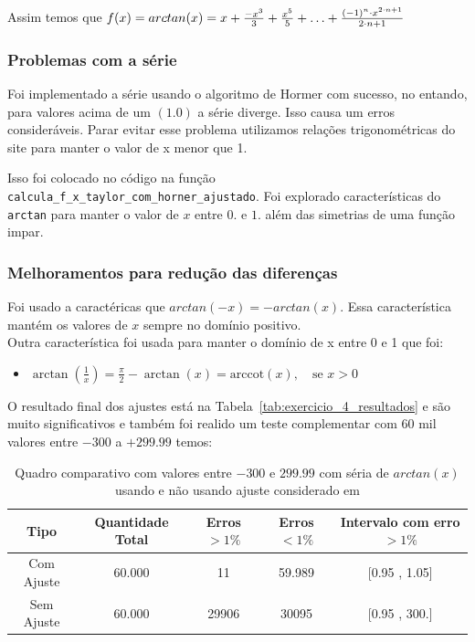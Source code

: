 Assim temos que $f(x) = arctan(x) = x + \frac{-x^3}{3} + \frac{x^5}{5} + \mathellipsis + \frac{(-1)^n \cdot x^{2 \cdot n + 1}}{2 \cdot n + 1} $

\subsubsection{Problemas com a série}

Foi implementado a série usando o algoritmo de Hormer com sucesso, no entando, para valores acima de um $(1.0)$ a série diverge.
Isso causa um erros consideráveis. Parar evitar esse problema utilizamos relações trigonométricas do site \cite{site-geek} para manter o valor de x menor que 1.

Isso foi colocado no código na função \texttt{calcula\_f\_x\_taylor\_com\_horner\_ajustado}. Foi explorado características do \texttt{arctan} para manter o valor de $x$ entre $0.$ e $1.$ além das simetrias de uma função impar.

\subsubsection{Melhoramentos para redução das diferenças}
\label{sec:melhoramentos-serie-arctan}

Foi usado a caractéricas que $arctan(-x) = -arctan(x)$. Essa característica mantém os valores de $x$ sempre no domínio positivo.\\
Outra característica foi usada para manter o domínio de x entre 0 e 1 que foi:

\begin{itemize}
    \item[] $\arctan\left(\frac{1}{x}\right) = \frac{\pi}{2} - \arctan(x) = \mathrm{arccot}(x), \quad \text{se } x > 0$
\end{itemize}

O resultado final dos ajustes está na Tabela~\ref{tab:exercicio_4_resultados} e são muito significativos e também foi realido um teste complementar com 60 mil valores entre $-300$ a $+299.99$ temos:

\begin{table}[h!]
    \centering
    \caption{Quadro comparativo com valores entre $-300$ e $299.99$ com séria de $arctan(x)$ usando e não usando ajuste considerado em \cite{site-geek}}
    \label{tab:exercicio_4_critica_1}
    \begin{tabular}{|c|c|c|c|c|}
        \hline
        \textbf{Tipo} & \textbf{Quantidade Total} & \textbf{Erros $>1\%$} & \textbf{Erros $<1\%$} & \textbf{Intervalo com erro $>1 \%$} \\
        \hline
        Com Ajuste & 60.000 & 11 & 59.989 & [0.95 , 1.05] \\
        Sem Ajuste & 60.000 & 29906 & 30095 & [0.95 , 300.] \\
        \hline
    \end{tabular}
\end{table}

